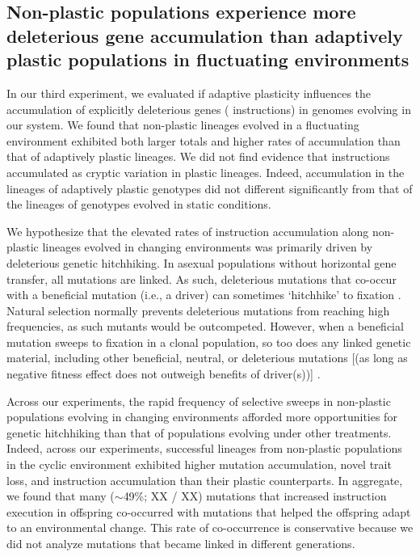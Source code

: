 \vspace{0.25cm}
\subsection{Non-plastic populations experience more deleterious gene accumulation than adaptively plastic populations in fluctuating environments}

In our third experiment, we evaluated if adaptive plasticity influences the accumulation of explicitly deleterious genes ( instructions) in genomes evolving in our system.
We found that non-plastic lineages evolved in a fluctuating environment exhibited both larger totals and higher rates of  accumulation than that of adaptively plastic lineages.
We did not find evidence that  instructions accumulated as cryptic variation in plastic lineages.
Indeed,  accumulation in the lineages of adaptively plastic genotypes did not different significantly from that of the lineages of genotypes evolved in static conditions.

We hypothesize that the elevated rates of  instruction accumulation along non-plastic lineages evolved in changing environments was primarily driven by deleterious genetic hitchhiking.
In asexual populations without horizontal gene transfer, all mutations are linked.
As such, deleterious mutations that co-occur with a beneficial mutation (i.e., a driver) can sometimes `hitchhike' to fixation \citep{smith_hitch-hiking_1974,van_den_bergh_experimental_2018,buskirk_hitchhiking_2017}.
Natural selection normally prevents deleterious mutations from reaching high frequencies, as such mutants would be outcompeted.
However, when a beneficial mutation sweeps to fixation in a clonal population, so too does any linked genetic material, including other beneficial, neutral, or deleterious mutations [(as long as negative fitness effect does not outweigh benefits of driver(s))] \cite{barton_genetic_2000, smith_hitch-hiking_1974}.

Across our experiments, the rapid frequency of selective sweeps in non-plastic populations evolving in changing environments afforded more opportunities for genetic hitchhiking than that of populations evolving under other treatments. 
Indeed, across our experiments, successful lineages from non-plastic populations in the cyclic environment exhibited higher mutation accumulation, novel trait loss, and  instruction accumulation than their plastic counterparts.
In aggregate, we found that many ($\sim$49\%; XX / XX) mutations that increased  instruction execution in offspring co-occurred with mutations that helped the offspring adapt to an environmental change.
This rate of co-occurrence is conservative because we did not analyze mutations that became linked in different generations.

